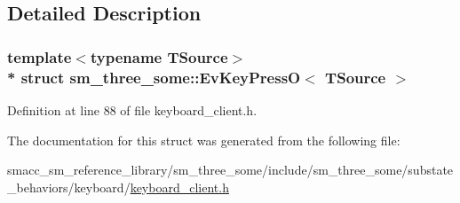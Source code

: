 \subsection{Detailed Description}
\subsubsection*{template$<$typename T\+Source$>$\\*
struct sm\+\_\+three\+\_\+some\+::\+Ev\+Key\+Press\+O$<$ T\+Source $>$}



Definition at line 88 of file keyboard\+\_\+client.\+h.



The documentation for this struct was generated from the following file\+:\begin{DoxyCompactItemize}
\item 
smacc\+\_\+sm\+\_\+reference\+\_\+library/sm\+\_\+three\+\_\+some/include/sm\+\_\+three\+\_\+some/substate\+\_\+behaviors/keyboard/\hyperlink{keyboard__client_8h}{keyboard\+\_\+client.\+h}\end{DoxyCompactItemize}
